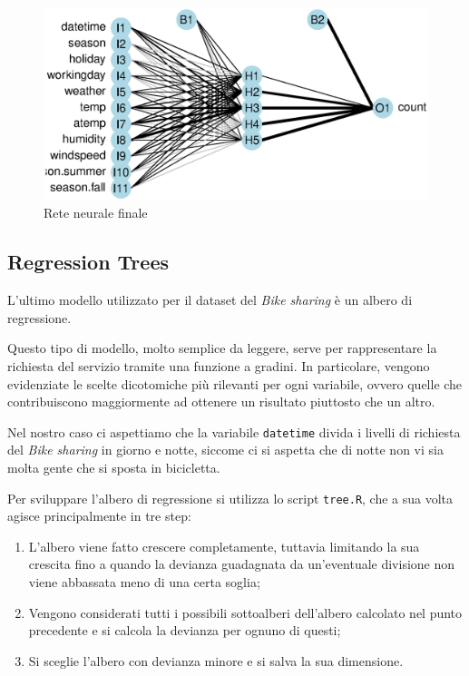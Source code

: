 \begin{figure}[H]
  \centering
  \includegraphics[width=.7\columnwidth]{images/non-linear/neural-network.eps}
  \caption{Rete neurale finale}
  \label{fig:nnet}
\end{figure}


\subsection{Regression Trees}\label{sec:trees}
L'ultimo modello utilizzato per il dataset del \emph{Bike sharing} è un albero
di regressione.

Questo tipo di modello, molto semplice da leggere, serve per rappresentare la
richiesta del servizio tramite una funzione a gradini.
In particolare, vengono evidenziate le scelte dicotomiche più rilevanti per
ogni variabile, ovvero quelle che contribuiscono maggiormente ad ottenere un
risultato piuttosto che un altro.

Nel nostro caso ci aspettiamo che la variabile \texttt{datetime} divida i
livelli di richiesta del \emph{Bike sharing} in giorno e notte, siccome ci
si aspetta che di notte non vi sia molta gente che si sposta in bicicletta.

Per sviluppare l'albero di regressione si utilizza lo script \texttt{tree.R},
che a sua volta agisce principalmente in tre step:

\begin{enumerate}
\item L'albero viene fatto crescere completamente, tuttavia limitando la sua
  crescita fino a quando la devianza guadagnata da un'eventuale divisione non
  viene abbassata meno di una certa soglia;
\item Vengono considerati tutti i possibili sottoalberi dell'albero calcolato
  nel punto precedente e si calcola la devianza per ognuno di questi;
\item Si sceglie l'albero con devianza minore e si salva la sua dimensione.
\end{enumerate}

